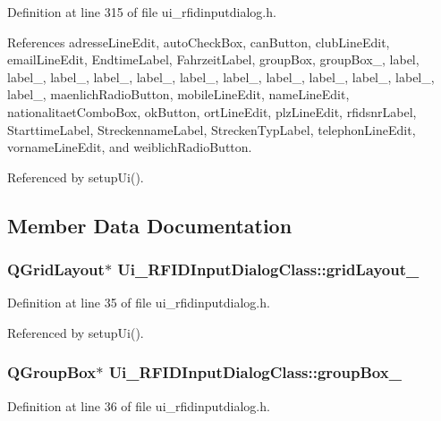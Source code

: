 Definition at line 315 of file ui\_\-rfidinputdialog.h.

References adresseLineEdit, autoCheckBox, canButton, clubLineEdit, emailLineEdit, EndtimeLabel, FahrzeitLabel, groupBox, groupBox\_, label, label\_, label\_, label\_, label\_, label\_, label\_, label\_, label\_, label\_, label\_, label\_, maenlichRadioButton, mobileLineEdit, nameLineEdit, nationalitaetComboBox, okButton, ortLineEdit, plzLineEdit, rfidsnrLabel, StarttimeLabel, StreckennameLabel, StreckenTypLabel, telephonLineEdit, vornameLineEdit, and weiblichRadioButton.

Referenced by setupUi().

\subsection{Member Data Documentation}
\hypertarget{class_ui___r_f_i_d_input_dialog_class_62f0b3f50ee15202731a2f0bab9b5470}{
\subsubsection[gridLayout\_\-2]{\setlength{\rightskip}{0pt plus 5cm}QGridLayout$\ast$ {\bf Ui\_\-RFIDInputDialogClass::gridLayout\_}}}
\label{class_ui___r_f_i_d_input_dialog_class_62f0b3f50ee15202731a2f0bab9b5470}




Definition at line 35 of file ui\_\-rfidinputdialog.h.

Referenced by setupUi().\hypertarget{class_ui___r_f_i_d_input_dialog_class_dc3b7fcb6dd3af1db8fafb18531f1dce}{
\subsubsection[groupBox\_\-2]{\setlength{\rightskip}{0pt plus 5cm}QGroupBox$\ast$ {\bf Ui\_\-RFIDInputDialogClass::groupBox\_}}}
\label{class_ui___r_f_i_d_input_dialog_class_dc3b7fcb6dd3af1db8fafb18531f1dce}




Definition at line 36 of file ui\_\-rfidinputdialog.h.

